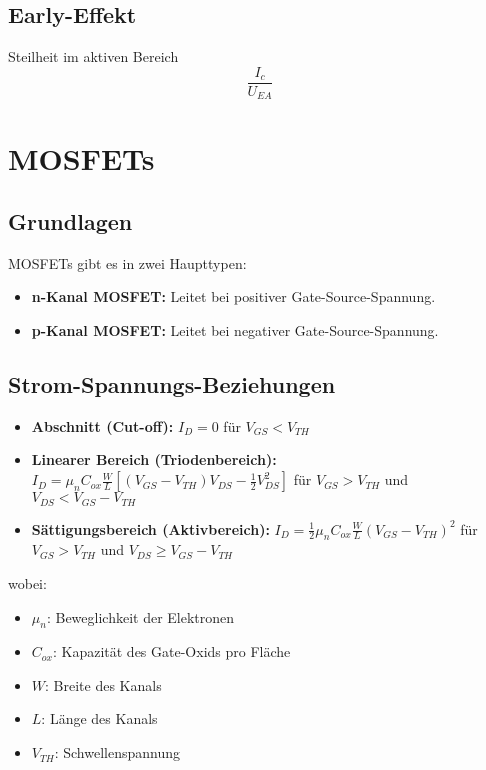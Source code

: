 \documentclass{article}
\begin{document}
\subsection*{Early-Effekt}
Steilheit im aktiven Bereich
\begin{equation*}
    \frac{I_c}{U_{EA}}
\end{equation*}
\section*{MOSFETs}

\subsection*{Grundlagen}
MOSFETs gibt es in zwei Haupttypen:
\begin{itemize}
    \item \textbf{n-Kanal MOSFET:} Leitet bei positiver Gate-Source-Spannung.
    \item \textbf{p-Kanal MOSFET:} Leitet bei negativer Gate-Source-Spannung.
\end{itemize}

\subsection*{Strom-Spannungs-Beziehungen}
\begin{itemize}
    \item \textbf{Abschnitt (Cut-off):} $I_D = 0$ für $V_{GS} < V_{TH}$
    \item \textbf{Linearer Bereich (Triodenbereich):} $I_D = \mu_n C_{ox} \frac{W}{L} [(V_{GS} - V_{TH})V_{DS} - \frac{1}{2}V_{DS}^2]$ für $V_{GS} > V_{TH}$ und $V_{DS} < V_{GS} - V_{TH}$
    \item \textbf{Sättigungsbereich (Aktivbereich):} $I_D = \frac{1}{2} \mu_n C_{ox} \frac{W}{L} (V_{GS} - V_{TH})^2$ für $V_{GS} > V_{TH}$ und $V_{DS} \ge V_{GS} - V_{TH}$
\end{itemize}
wobei:
\begin{itemize}
    \item $\mu_n$: Beweglichkeit der Elektronen
    \item $C_{ox}$: Kapazität des Gate-Oxids pro Fläche
    \item $W$: Breite des Kanals
    \item $L$: Länge des Kanals
    \item $V_{TH}$: Schwellenspannung
\end{itemize}
\end{document}

